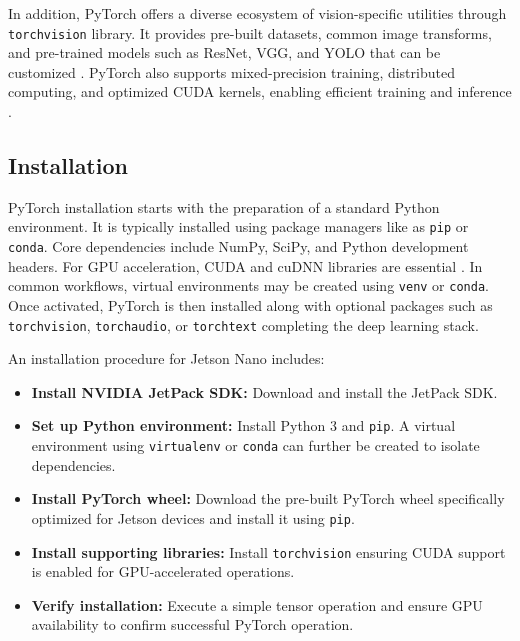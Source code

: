 In addition, PyTorch offers a diverse ecosystem of vision-specific utilities through \texttt{torchvision} library. It provides pre-built datasets, common image transforms, and pre-trained models such as ResNet, VGG, and YOLO that can be customized \cite{torchvision_docs}. PyTorch also supports mixed-precision training, distributed computing, and optimized CUDA kernels, enabling efficient training and inference \cite{nvidia_jetson}. 

\subsection{Installation}

PyTorch installation starts with the preparation of a standard Python environment. It is typically installed using package managers like as \texttt{pip} or \texttt{conda}. Core dependencies include NumPy, SciPy, and Python development headers. For GPU acceleration, CUDA and cuDNN libraries are essential \cite{paszke2019pytorch, kulkarni2022cvprojects}. In common workflows, virtual environments may be created using \texttt{venv} or \texttt{conda}. Once activated, PyTorch is then installed along with optional packages such as \texttt{torchvision}, \texttt{torchaudio}, or \texttt{torchtext} completing the deep learning stack. 

An installation procedure for Jetson Nano includes:

\begin{itemize}
	\item \textbf{Install NVIDIA JetPack SDK:} Download and install the JetPack SDK.
	\item \textbf{Set up Python environment:} Install Python 3 and \texttt{pip}. A virtual environment using \texttt{virtualenv} or \texttt{conda} can further be created to isolate dependencies.
	\item \textbf{Install PyTorch wheel:} Download the pre-built PyTorch wheel specifically optimized for Jetson devices and install it using \texttt{pip}.
	\item \textbf{Install supporting libraries:} Install \texttt{torchvision} ensuring CUDA support is enabled for GPU-accelerated operations.
	\item \textbf{Verify installation:} Execute a simple tensor operation and ensure GPU availability to confirm successful PyTorch operation.
\end{itemize}

